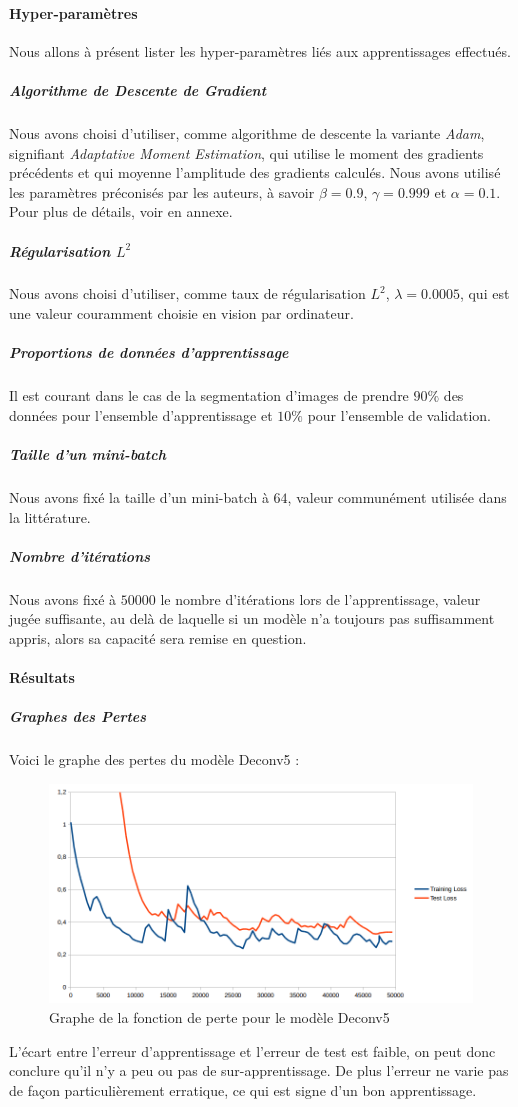 \documentclass[a4paper, 11pt]{report}
\begin{document}
\paragraph{Hyper-paramètres}
Nous allons à présent lister les hyper-paramètres liés aux apprentissages effectués.
\subparagraph{Algorithme de Descente de Gradient}
Nous avons choisi d'utiliser, comme algorithme de descente la variante \emph{Adam}, signifiant \emph{Adaptative Moment Estimation}, qui utilise le moment des gradients précédents et qui moyenne l'amplitude des gradients calculés.
Nous avons utilisé les paramètres préconisés par les auteurs, à savoir $\beta = 0.9$, $\gamma = 0.999$ et $\alpha = 0.1$.
Pour plus de détails, voir en annexe.
\subparagraph{Régularisation $L^2$}
Nous avons choisi d'utiliser, comme taux de régularisation $L^2$, $\lambda = 0.0005$, qui est une valeur couramment choisie en vision par ordinateur.
\subparagraph{Proportions de données d'apprentissage}
Il est courant dans le cas de la segmentation d'images de prendre $90\%$ des données pour l'ensemble d'apprentissage et $10\%$ pour l'ensemble de validation.
\subparagraph{Taille d'un \emph{mini-batch}}
Nous avons fixé la taille d'un mini-batch à $64$, valeur communément utilisée dans la littérature.
\subparagraph{Nombre d'itérations}
Nous avons fixé à $50000$ le nombre d'itérations lors de l'apprentissage, valeur jugée suffisante, au delà de laquelle si un modèle n'a toujours pas suffisamment appris, alors sa capacité sera remise en question.
\paragraph{Résultats}
\subparagraph{Graphes des Pertes}
Voici le graphe des pertes du modèle Deconv5 :
\begin{figure}[H]
	\centering
	\includegraphics[scale=0.6]{Images/Losses_Deconv5.png}
	\caption{Graphe de la fonction de perte pour le modèle Deconv5}
\end{figure}
L'écart entre l'erreur d'apprentissage et l'erreur de test est faible, on peut donc conclure qu'il n'y a peu ou pas de sur-apprentissage.
De plus l'erreur ne varie pas de façon particulièrement erratique, ce qui est signe d'un bon apprentissage.
\end{document}
